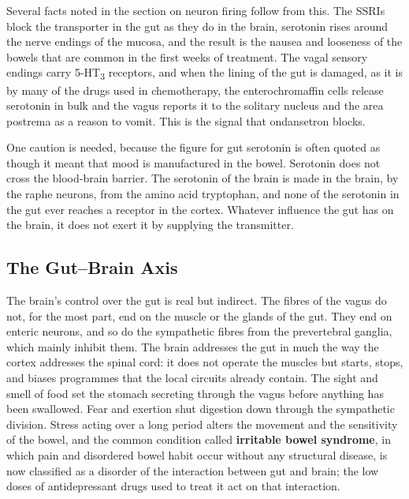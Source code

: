 \documentclass[11pt]{article}
\begin{document}
Several facts noted in the section on neuron firing follow from this. The SSRIs block the transporter in the gut as they do in the brain, serotonin rises around the nerve endings of the mucosa, and the result is the nausea and looseness of the bowels that are common in the first weeks of treatment. The vagal sensory endings carry 5-HT\textsubscript{3} receptors, and when the lining of the gut is damaged, as it is by many of the drugs used in chemotherapy, the enterochromaffin cells release serotonin in bulk and the vagus reports it to the solitary nucleus and the area postrema as a reason to vomit. This is the signal that ondansetron blocks.

One caution is needed, because the figure for gut serotonin is often quoted as though it meant that mood is manufactured in the bowel. Serotonin does not cross the blood-brain barrier. The serotonin of the brain is made in the brain, by the raphe neurons, from the amino acid tryptophan, and none of the serotonin in the gut ever reaches a receptor in the cortex. Whatever influence the gut has on the brain, it does not exert it by supplying the transmitter.

\subsection{The Gut--Brain Axis}

The brain's control over the gut is real but indirect. The fibres of the vagus do not, for the most part, end on the muscle or the glands of the gut. They end on enteric neurons, and so do the sympathetic fibres from the prevertebral ganglia, which mainly inhibit them. The brain addresses the gut in much the way the cortex addresses the spinal cord: it does not operate the muscles but starts, stops, and biases programmes that the local circuits already contain. The sight and smell of food set the stomach secreting through the vagus before anything has been swallowed. Fear and exertion shut digestion down through the sympathetic division. Stress acting over a long period alters the movement and the sensitivity of the bowel, and the common condition called \textbf{irritable bowel syndrome}, in which pain and disordered bowel habit occur without any structural disease, is now classified as a disorder of the interaction between gut and brain; the low doses of antidepressant drugs used to treat it act on that interaction.
\end{document}
